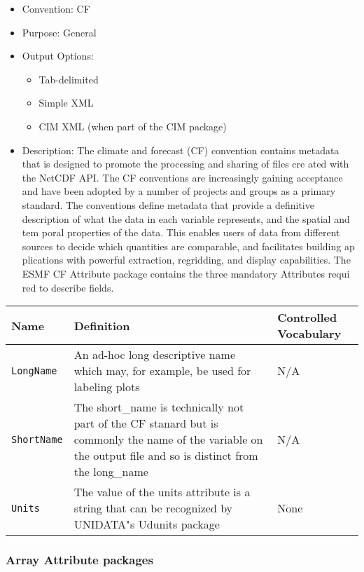 \begin{itemize}
    \item Convention: CF
    \item Purpose: General
    \item Output Options:
    \begin{itemize}
        \item Tab-delimited
        \item Simple XML
        \item CIM XML (when part of the CIM package)
    \end{itemize} 
    \item  Description: The climate and forecast (CF) convention contains metadata that is designed to promote the processing and sharing of files cre
ated with the NetCDF API. The CF conventions are increasingly gaining acceptance and have been adopted by a number of projects and groups as a primary
 standard. The conventions define metadata that provide a definitive description of what the data in each variable represents, and the spatial and tem
poral properties of the data. This enables users of data from different sources to decide which quantities are comparable, and facilitates building ap
plications with powerful extraction, regridding, and display capabilities. The ESMF CF Attribute package contains the three mandatory Attributes requi
red to describe fields.  
\end{itemize}

\begin{tabular}{|p{6cm}|p{10cm}|p{10cm}|}
    {\bf Name } & {\bf Definition} & {\bf Controlled Vocabulary} \\
    \hline\hline
    {\tt LongName} & An ad-hoc long descriptive name which may, for example, be used for labeling plots & N/A\\
    {\tt ShortName}  & The short\_name is technically not part of the CF stanard but is commonly the name of the variable on the output file and so is
 distinct from the long\_name & N/A \\
    {\tt Units}  & The value of the units attribute is a string that can be recognized by UNIDATA"s Udunits package & None\\
\end{tabular}


\vspace{.20in}
\subsubsection{Array Attribute packages}
\label{ArrayAttributePackages}

